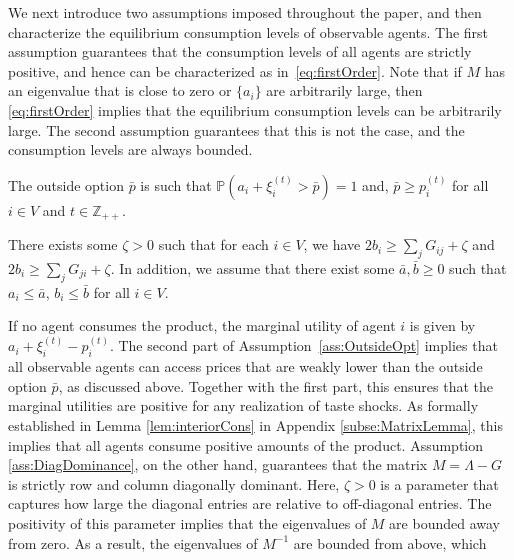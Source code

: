 \documentclass[opre,nonblindrev]{informs3} %
\begin{document}

We next introduce two assumptions 
imposed throughout the paper, and then characterize the equilibrium consumption levels of observable agents.
The first assumption guarantees that  the  consumption levels of all agents are strictly positive, and hence
 can  be characterized as in~\eqref{eq:firstOrder}.
{Note that if $M$ has an eigenvalue that is close to zero or $\{a_i\}$ are arbitrarily large, then \eqref{eq:firstOrder} implies that the equilibrium consumption levels can be arbitrarily large.}
 The second assumption guarantees that
 this is not the case, and the consumption levels are always bounded.
\begin{assumption}\label{ass:OutsideOpt}
	The outside option 
	$\bar p$
	is such that $\mathbb{P}(a_i + \xi_i^{(t)} > \bar p )=1$
	and, $\bar p \geq p_i^{(t)}$
	 for all $i\in V$ and $t\in \mathbb{Z}_{++}$.
\end{assumption}
\begin{assumption} \label{ass:DiagDominance}
	There exists some 
	$\zeta>0$
	such that
	for each $i\in V$, we have
	$	2b_i \geq  \sum_j G_{ij}  + \zeta 	$
	and
	$	2b_i \geq  \sum_j G_{ji}  + \zeta $.	
In addition,
		we assume that there exist some
		$\bar{a},\bar{b} \geq 0$ such that
		$a_i \leq \bar{a}$, $b_i \leq \bar{b}$ for all $i\in V$.
\end{assumption}
If no agent consumes the product, the marginal utility of agent $i$ is given by $a_i+ \xi_i^{(t)} - p_i^{(t)}$.
The second part of 
	Assumption~\ref{ass:OutsideOpt}   implies that all 
	observable
	agents can access prices that are weakly lower than the outside option $\bar p$, as discussed above.
	Together with the first part, this ensures that the marginal utilities are positive 
 for any realization of taste shocks. 
As formally established in Lemma
\ref{lem:interiorCons} in Appendix \ref{subse:MatrixLemma},
this implies that
all agents consume positive amounts of the product.
Assumption \ref{ass:DiagDominance}, on the other hand, guarantees that
the matrix $M=\Lambda-G$ is strictly row and column diagonally dominant.
Here, $\zeta >0$ is a parameter that captures how large the diagonal entries are relative to off-diagonal entries. The
positivity of this parameter implies that  the eigenvalues of $M$ are bounded away from zero.
As a result, the eigenvalues of $M^{-1}$ are bounded from above, which
\end{document}
